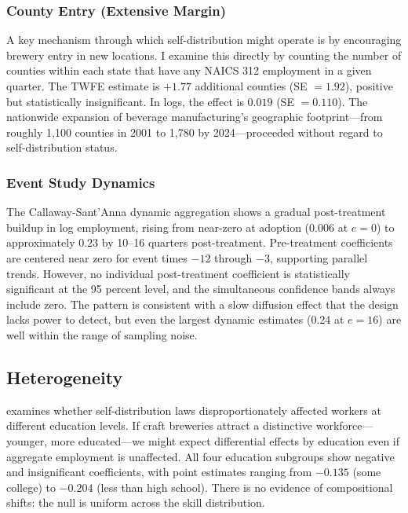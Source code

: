 \documentclass[12pt]{article}
\begin{document}
\subsubsection*{County Entry (Extensive Margin)} A key mechanism through which self-distribution might operate is by encouraging brewery entry in new locations. I examine this directly by counting the number of counties within each state that have any NAICS 312 employment in a given quarter. The TWFE estimate is $+1.77$ additional counties (SE $= 1.92$), positive but statistically insignificant. In logs, the effect is $0.019$ (SE $= 0.110$). The nationwide expansion of beverage manufacturing's geographic footprint---from roughly 1,100 counties in 2001 to 1,780 by 2024---proceeded without regard to self-distribution status.

\subsubsection*{Event Study Dynamics} The Callaway-Sant'Anna dynamic aggregation shows a gradual post-treatment buildup in log employment, rising from near-zero at adoption ($0.006$ at $e = 0$) to approximately $0.23$ by 10--16 quarters post-treatment. Pre-treatment coefficients are centered near zero for event times $-12$ through $-3$, supporting parallel trends. However, no individual post-treatment coefficient is statistically significant at the 95 percent level, and the simultaneous confidence bands always include zero. The pattern is consistent with a slow diffusion effect that the design lacks power to detect, but even the largest dynamic estimates (0.24 at $e = 16$) are well within the range of sampling noise.

\subsection{Heterogeneity}



 examines whether self-distribution laws disproportionately affected workers at different education levels. If craft breweries attract a distinctive workforce---younger, more educated---we might expect differential effects by education even if aggregate employment is unaffected. All four education subgroups show negative and insignificant coefficients, with point estimates ranging from $-0.135$ (some college) to $-0.204$ (less than high school). There is no evidence of compositional shifts: the null is uniform across the skill distribution.
\end{document}
